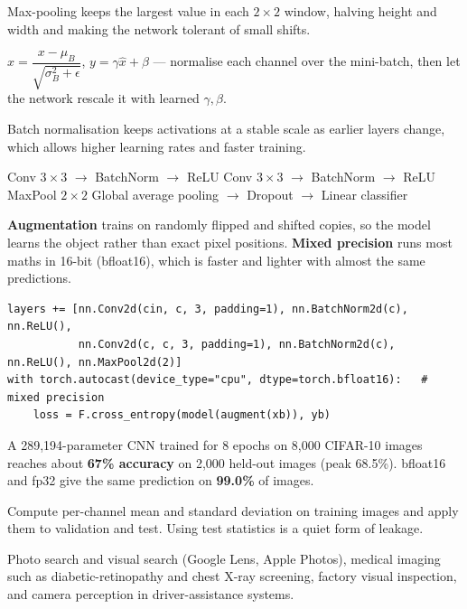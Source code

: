 \documentclass[11pt,a4paper]{article}
\begin{document}
\begin{bdef}[Pooling]
Max-pooling keeps the largest value in each $2\times2$ window, halving height and width and making the network tolerant of small shifts.
\end{bdef}
\begin{bmath}
$\hat x=\dfrac{x-\mu_B}{\sqrt{\sigma_B^2+\epsilon}}$, \;$y=\gamma\hat x+\beta$ --- normalise each channel over the mini-batch, then let the network rescale it with learned $\gamma,\beta$.
\end{bmath}
Batch normalisation keeps activations at a stable scale as earlier layers change, which allows higher learning rates and faster training.
\begin{balgo}
\begin{algorithmic}[1]
  \State Conv $3\times3$ $\rightarrow$ BatchNorm $\rightarrow$ ReLU
  \State Conv $3\times3$ $\rightarrow$ BatchNorm $\rightarrow$ ReLU
  \State MaxPool $2\times2$
\EndFor
\State Global average pooling $\rightarrow$ Dropout $\rightarrow$ Linear classifier
\end{algorithmic}
\end{balgo}
\begin{bdef}
\textbf{Augmentation} trains on randomly flipped and shifted copies, so the model learns the object rather than exact pixel positions. \textbf{Mixed precision} runs most maths in 16-bit (bfloat16), which is faster and lighter with almost the same predictions.
\end{bdef}
\begin{bcode}
\begin{lstlisting}
layers += [nn.Conv2d(cin, c, 3, padding=1), nn.BatchNorm2d(c), nn.ReLU(),
           nn.Conv2d(c, c, 3, padding=1), nn.BatchNorm2d(c), nn.ReLU(), nn.MaxPool2d(2)]
with torch.autocast(device_type="cpu", dtype=torch.bfloat16):   # mixed precision
    loss = F.cross_entropy(model(augment(xb)), yb)
\end{lstlisting}
\end{bcode}
\begin{bres}
A 289,194-parameter CNN trained for 8 epochs on 8,000 CIFAR-10 images reaches about \textbf{67\% accuracy} on 2,000 held-out images (peak 68.5\%). bfloat16 and fp32 give the same prediction on \textbf{99.0\%} of images.
\end{bres}
\begin{bwarn}
Compute per-channel mean and standard deviation on training images and apply them to validation and test. Using test statistics is a quiet form of leakage.
\end{bwarn}
\begin{bapp}
Photo search and visual search (Google Lens, Apple Photos), medical imaging such as diabetic-retinopathy and chest X-ray screening, factory visual inspection, and camera perception in driver-assistance systems.
\end{bapp}
\end{document}
